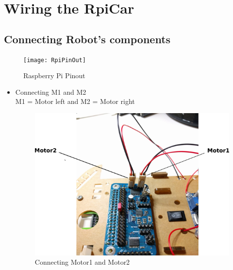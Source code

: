 \documentclass[
12pt, %
a4paper, %
oneside, %
headinclude,footinclude, %
BCOR5mm, %
table,
]{scrartcl}
\begin{document}
\section{Wiring the RpiCar}
\subsection{Connecting Robot's components}

\begin{figure}[H]
\centering
\texttt{[image: RpiPinOut]} 
\caption[Raspberry Pi Pinout]{Raspberry Pi Pinout \footnotemark}
\label{fig:Raspberry Pi Pinout}
\end{figure}

\begin{itemize}

\item Connecting M1 and M2\\
M1 = Motor left and M2 = Motor right
	\begin{figure}[H]
	\centering
	\includegraphics[scale=0.8]{Figures/ConnectM1M2.png}
	\caption{Connecting Motor1 and Motor2}
	\label{Connectng Motor1 and Motor2 }
	\end{figure}
	

\end{itemize}
\end{document}
